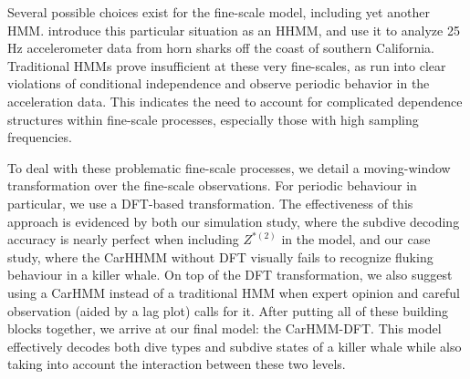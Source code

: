 Several possible choices exist for the fine-scale model, including yet another HMM. \citet{Barajas:2017} introduce this particular situation as an HHMM, and \citet{Adam:2019} use it to analyze 25 Hz accelerometer data from horn sharks off the coast of southern California. Traditional HMMs prove insufficient at these very fine-scales, as \citet{Adam:2019} run into clear violations of conditional independence and observe periodic behavior in the acceleration data. This indicates the need to account for complicated dependence structures within fine-scale processes, especially those with high sampling frequencies. 




To deal with these problematic fine-scale processes, we detail a moving-window transformation over the fine-scale observations. For periodic behaviour in particular, we use a DFT-based transformation. The effectiveness of this approach is evidenced by both our simulation study, where the subdive decoding accuracy is nearly perfect when including $Z^{*(2)}$ in the model, and our case study, where the CarHHMM without DFT visually fails to recognize fluking behaviour in a killer whale. On top of the DFT transformation, we also suggest using a CarHMM instead of a traditional HMM when expert opinion and careful observation (aided by a lag plot) calls for it. After putting all of these building blocks together, we arrive at our final model: the CarHMM-DFT. This model effectively decodes both dive types and subdive states of a killer whale while also taking into account the interaction between these two levels. 

